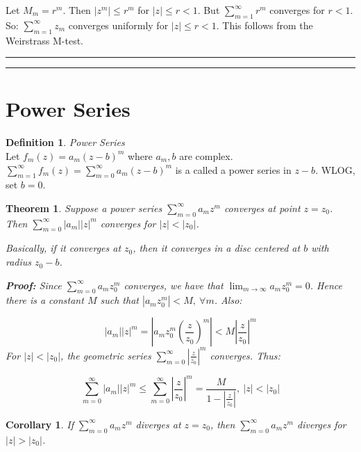 \documentclass{article}
\newtheorem{theorem}{Theorem}[section]
\newtheorem{corollary}{Corollary}
\theoremstyle{definition}
\newtheorem{definition}{Definition}[section]
\newcommand{\Section}[1]{\hrule\hrule\section{#1}}
\newcommand{\Def}[2]{
\begin{shaded*}
\begin{definition}{\textit{#1}}\\#2\end{definition}
\end{shaded*}
}
\begin{document}
Let $M_m = r^m$. Then $|z^m| \leq r^m$ for $|z| \leq r < 1$. But $\sum_{m=1}^\infty r^m$ converges for $r<1$. So: $\sum_{m=1}^\infty z_m$ converges uniformly for $|z| \leq r < 1$. This follows from the Weirstrass M-test. 

\Section{Power Series}
\Def{Power Series}{Let $f_m(z) = a_m(z-b)^m$ where $a_m, b$ are complex. $\sum_{m=1}^\infty f_m(z) = \sum_{m=0}^\infty a_m(z-b)^m$ is a called a power series in $z-b$. WLOG, set $b=0$. }

\begin{theorem}
Suppose a power series $\sum_{m=0}^\infty a_m z^m$ converges at point $z=z_0$. Then $\sum_{m=0}^\infty |a_m| |z|^m$ converges for $|z|<|z_0|$. 

Basically, if it converges at $z_0$, then it converges in a disc centered at $b$ with radius $z_0-b$. 

\textbf{Proof:} Since $\sum_{m=0}^\infty a_m z_0^m$ converges, we have that $\lim_{m \to \infty }a_m z_0^m = 0$. Hence there is a constant $M$ such that $\left|a_mz_0^m\right|<M,\ \forall m$. Also:

$$|a_m| |z|^m =\left| a_m z_0^m \left(\frac{z}{z_0}\right)^m \right| < M \left|\frac{z}{z_0}\right|^m$$
For $|z|<|z_0|$, the geometric series $\sum_{m=0}^\infty \left|\frac{z}{z_0}\right|^m$ converges. Thus:

$$\sum_{m=0}^\infty |a_m| |z|^m \leq \sum_{m=0}^\infty \left|\frac{z}{z_0}\right|^m = \frac{M}{1-\left|\frac{z}{z_0}\right|},\ |z|<|z_0|$$
\end{theorem}

\begin{corollary}
If $\sum_{m=0}^\infty a_m z^m$ diverges at $z = z_0$, then $\sum_{m=0}^\infty a_m z^m$ diverges for $|z| > |z_0|$. 
\end{corollary}
\end{document}
